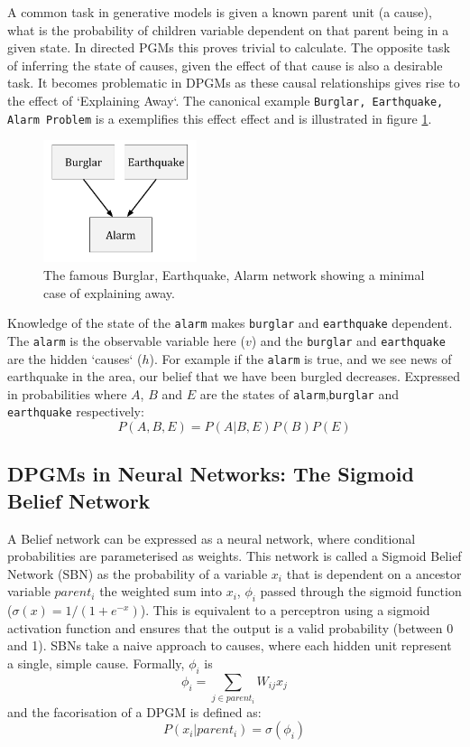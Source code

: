 A common task in generative models is given a known parent unit (a cause), what is the probability of children variable dependent on that parent being in a given state. In directed PGMs this proves trivial to calculate. The opposite task of inferring the state of causes, given the effect of that cause is also a desirable task. It becomes problematic in DPGMs as these causal relationships gives rise to the effect of `Explaining Away`. The canonical example \texttt{Burglar, Earthquake, Alarm Problem} is a exemplifies this effect effect\cite{Barber:2012:BRM:2207809} and is illustrated in figure \ref{F:Explaining-Away}.
\begin{figure}[h]
\begin{center}
  \includegraphics[width = 0.4\textwidth]{Assets/Explaining_Away.png}
\caption{The famous Burglar, Earthquake, Alarm network showing a minimal case of explaining away.}
\label{F:Explaining-Away}
\end{center}
\end{figure}
Knowledge of the state of the \texttt{alarm} makes \texttt{burglar} and \texttt{earthquake} dependent. The \texttt{alarm} is the observable variable here ($v$) and the \texttt{burglar} and \texttt{earthquake} are the hidden `causes` ($h$). For example if the \texttt{alarm} is true, and we see news of earthquake in the area, our belief that we have been burgled decreases. Expressed in probabilities where $A$, $B$ and $E$ are the states of \texttt{alarm},\texttt{burglar} and \texttt{earthquake} respectively:
$$
P(A,B,E) = P(A|B,E)P(B)P(E)
$$

\subsection{DPGMs in Neural Networks: The Sigmoid Belief Network}

A Belief network can be expressed as a neural network, where conditional probabilities are parameterised as weights. This network is called a Sigmoid Belief Network (SBN) as the probability of a variable $x_i$ that is dependent on a ancestor variable $parent_i$ the weighted sum into $x_i$, $\phi_i$ passed through the sigmoid function ($ \sigma(x)=1/(1+e^{-x})$). This is equivalent to a perceptron using a sigmoid activation function and ensures that the output is a valid probability (between 0 and 1).
SBNs take a naive approach to causes, where each hidden unit represent a single, simple cause. Formally, $\phi_i$ is
$$ \phi_i = \sum_{j \in parent_i} W_{ij}x_j$$
and the facorisation of a DPGM is defined as:
$$
P(x_i | parent_i) = \sigma(\phi_i)
$$

